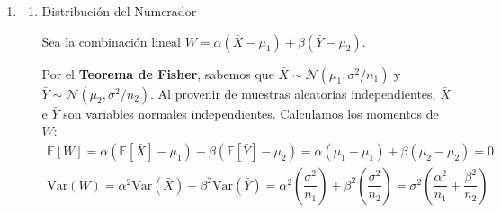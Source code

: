 \begin{enumerate}[label=\color{red}\textbf{\arabic*)}]
\begin{enumerate}[label=\arabic*)]
		            El documento define la \textbf{caracterización de la t de Student como cociente:} Si $Z\sim \mathcal{N}(0,1$ y $U\sim \chi_p^2$ son independientes, el cociente $$T=\dfrac{Z}{\sqrt{U / p} }\sim t_p$$
		            Aplicamos esta definición sustituyendo nuestra $Z$ y nuestra $U$ (con $p=n-1$ grados de libertad): $$T=\dfrac{\frac{X_{n+1}}{\sigma \sqrt{\frac{n+1}{n} } } }{\sqrt{\frac{\frac{(n-1)S^2}{\sigma^2} }{n-1} } }$$
		            Simplificando el denominador cancelando los grados de libertad $(n-1)$: \[T=\dfrac{\frac{X_{n+1}-\bar{X}}{\sigma \sqrt{\frac{n+1}{n} } } }{\sqrt{\frac{S^2}{\sigma^2} } }=\dfrac{\frac{X_{n+1}-\bar{X}}{\sigma \sqrt{\frac{n+1}{n} } }}{\frac{S}{\sigma} }\]
		            Cancelamos la desviación típica poblacional $\sigma$: $$T=\dfrac{X_{n+1}-\bar{X}}{S \sqrt{\frac{n+1}{n} } }=\dfrac{X_{n+1}-\bar{X}}{S} \sqrt{\dfrac{n}{n+1} }$$
	      \end{enumerate}
	      \textbf{Conclusión}

	      A través de la definición matemática del cociente, hemos llegado exactamente a la expresión del estadístico planteado en el problema. Por lo tanto, la distribución en el muestreo de este estadístico es una \textbf{distribución t de Student con $n-1$ grados de libertad:} $$\dfrac{X_{n+1}-\bar{X}}{S} \sqrt{\dfrac{n}{n++1} } \sim t_{n-1}$$
	\item {}

	      \begin{enumerate}[label=\arabic*)]
		      \item Distribución del Numerador

		            Sea la combinación lineal $W=\alpha(\bar{X}-\mu_1)+\beta(\bar{Y}-\mu_2)$.

		            Por el \textbf{Teorema de Fisher}, sabemos que $\bar{X}\sim \mathcal{N}(\mu_1,\sigma^2 / n_1)$ y $\bar{Y}\sim \mathcal{N}(\mu_2,\sigma^2 / n_2)$. Al provenir de muestras aleatorias independientes, $\bar{X}$ e $\bar{Y}$ son variables normales independientes. Calculamos los momentos de $W$:
		            \[
			            \begin{array}{c}
				            \mathbb{E}[W]=\alpha(\mathbb{E}[\bar{X}]-\mu_1)+\beta(\mathbb{E}[\bar{Y}]-\mu_2)=\alpha(\mu_1-\mu_1)+\beta(\mu_2-\mu_2)=0 \\
				            \mathrm{Var}(W)=\alpha^2\mathrm{Var}(\bar{X})+\beta^2\mathrm{Var}(\bar{Y})=\alpha^2\left( \dfrac{\sigma^2}{n_1} \right) +\beta^2\left( \dfrac{\sigma^2}{n_2} \right) =\sigma^2\left( \dfrac{\alpha^2}{n_1}+\dfrac{\beta^2}{n_2} \right)
			            \end{array}
		            \]


\end{enumerate}
\end{enumerate}
